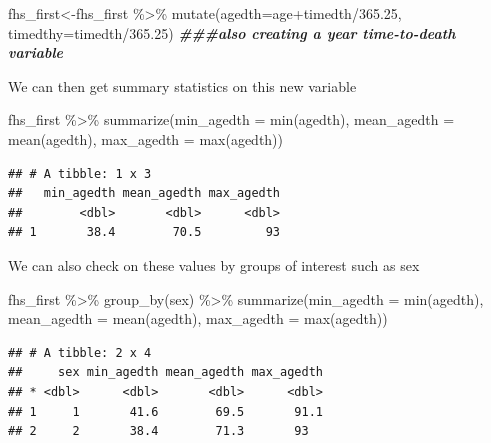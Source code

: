 \documentclass[
]{book}
\newenvironment{Shaded}{\begin{snugshade}}{\end{snugshade}}
\newcommand{\AttributeTok}[1]{\textcolor[rgb]{0.77,0.63,0.00}{#1}}
\newcommand{\DocumentationTok}[1]{\textcolor[rgb]{0.56,0.35,0.01}{\textbf{\textit{#1}}}}
\newcommand{\FloatTok}[1]{\textcolor[rgb]{0.00,0.00,0.81}{#1}}
\newcommand{\FunctionTok}[1]{\textcolor[rgb]{0.00,0.00,0.00}{#1}}
\newcommand{\NormalTok}[1]{#1}
\newcommand{\OtherTok}[1]{\textcolor[rgb]{0.56,0.35,0.01}{#1}}
\newcommand{\SpecialCharTok}[1]{\textcolor[rgb]{0.00,0.00,0.00}{#1}}
\begin{document}
\begin{Shaded}
\begin{Highlighting}[]
\NormalTok{fhs\_first}\OtherTok{\textless{}{-}}\NormalTok{fhs\_first }\SpecialCharTok{\%\textgreater{}\%} 
\FunctionTok{mutate}\NormalTok{(}\AttributeTok{agedth=}\NormalTok{age}\SpecialCharTok{+}\NormalTok{timedth}\SpecialCharTok{/}\FloatTok{365.25}\NormalTok{,}
       \AttributeTok{timedthy=}\NormalTok{timedth}\SpecialCharTok{/}\FloatTok{365.25}\NormalTok{) }\DocumentationTok{\#\#\#also creating a year time{-}to{-}death variable}
\end{Highlighting}
\end{Shaded}

We can then get summary statistics on this new variable

\begin{Shaded}
\begin{Highlighting}[]
\NormalTok{fhs\_first }\SpecialCharTok{\%\textgreater{}\%} 
\FunctionTok{summarize}\NormalTok{(}\AttributeTok{min\_agedth =} \FunctionTok{min}\NormalTok{(agedth),}
\AttributeTok{mean\_agedth =} \FunctionTok{mean}\NormalTok{(agedth),}
\AttributeTok{max\_agedth =} \FunctionTok{max}\NormalTok{(agedth))}
\end{Highlighting}
\end{Shaded}

\begin{verbatim}
## # A tibble: 1 x 3
##   min_agedth mean_agedth max_agedth
##        <dbl>       <dbl>      <dbl>
## 1       38.4        70.5         93
\end{verbatim}

We can also check on these values by groups of interest such as sex

\begin{Shaded}
\begin{Highlighting}[]
\NormalTok{fhs\_first }\SpecialCharTok{\%\textgreater{}\%} 
\FunctionTok{group\_by}\NormalTok{(sex) }\SpecialCharTok{\%\textgreater{}\%}
\FunctionTok{summarize}\NormalTok{(}\AttributeTok{min\_agedth =} \FunctionTok{min}\NormalTok{(agedth),}
\AttributeTok{mean\_agedth =} \FunctionTok{mean}\NormalTok{(agedth),}
\AttributeTok{max\_agedth =} \FunctionTok{max}\NormalTok{(agedth))}
\end{Highlighting}
\end{Shaded}

\begin{verbatim}
## # A tibble: 2 x 4
##     sex min_agedth mean_agedth max_agedth
## * <dbl>      <dbl>       <dbl>      <dbl>
## 1     1       41.6        69.5       91.1
## 2     2       38.4        71.3       93
\end{verbatim}
\end{document}
